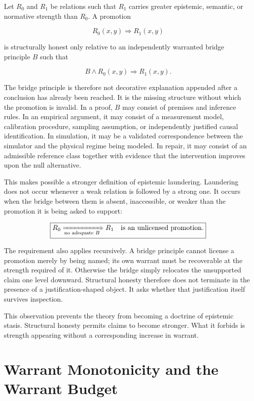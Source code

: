 \documentclass[11pt]{article}
\begin{document}
Let $R_0$ and $R_1$ be relations such that $R_1$ carries greater epistemic, semantic, or normative strength than $R_0$. A promotion

\[
R_0(x,y) \Longrightarrow R_1(x,y)
\]

is structurally honest only relative to an independently warranted bridge principle $B$ such that

\[
B \land R_0(x,y) \Longrightarrow R_1(x,y).
\]

The bridge principle is therefore not decorative explanation appended after a conclusion has already been reached. It is the missing structure without which the promotion is invalid. In a proof, $B$ may consist of premises and inference rules. In an empirical argument, it may consist of a measurement model, calibration procedure, sampling assumption, or independently justified causal identification. In simulation, it may be a validated correspondence between the simulator and the physical regime being modeled. In repair, it may consist of an admissible reference class together with evidence that the intervention improves upon the null alternative.

This makes possible a stronger definition of epistemic laundering. Laundering does not occur whenever a weak relation is followed by a strong one. It occurs when the bridge between them is absent, inaccessible, or weaker than the promotion it is being asked to support:

\[
\boxed{
R_0 \xRightarrow[\text{no adequate }B]{} R_1
\quad\text{is an unlicensed promotion.}
}
\]

The requirement also applies recursively. A bridge principle cannot license a promotion merely by being named; its own warrant must be recoverable at the strength required of it. Otherwise the bridge simply relocates the unsupported claim one level downward. Structural honesty therefore does not terminate in the presence of a justification-shaped object. It asks whether that justification itself survives inspection.

This observation prevents the theory from becoming a doctrine of epistemic stasis. Structural honesty permits claims to become stronger. What it forbids is strength appearing without a corresponding increase in warrant.

\section{Warrant Monotonicity and the Warrant Budget}
\label{sec:warrant-budget}
\end{document}
